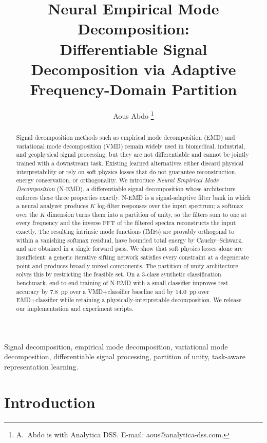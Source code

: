 \documentclass[journal]{IEEEtran}
\title{Neural Empirical Mode Decomposition:\\
Differentiable Signal Decomposition via Adaptive Frequency-Domain Partition}
\author{Aous Abdo%
\thanks{A.~Abdo is with Analytica DSS. E-mail: aous@analytica-dss.com.}%
}
\begin{document}
\maketitle

\begin{abstract}
Signal decomposition methods such as empirical mode decomposition (EMD) and variational mode decomposition (VMD) remain widely used in biomedical, industrial, and geophysical signal processing, but they are not differentiable and cannot be jointly trained with a downstream task. Existing learned alternatives either discard physical interpretability or rely on soft physics losses that do not guarantee reconstruction, energy conservation, or orthogonality. We introduce \emph{Neural Empirical Mode Decomposition} (N-EMD), a differentiable signal decomposition whose architecture enforces these three properties exactly. N-EMD is a signal-adaptive filter bank in which a neural analyzer produces $K$ log-filter responses over the input spectrum; a softmax over the $K$ dimension turns them into a partition of unity, so the filters sum to one at every frequency and the inverse FFT of the filtered spectra reconstructs the input exactly. The resulting intrinsic mode functions (IMFs) are provably orthogonal to within a vanishing softmax residual, have bounded total energy by Cauchy--Schwarz, and are obtained in a single forward pass. We show that soft physics losses alone are insufficient: a generic iterative sifting network satisfies every constraint at a degenerate point and produces broadly mixed components. The partition-of-unity architecture solves this by restricting the feasible set. On a 3-class synthetic classification benchmark, end-to-end training of N-EMD with a small classifier improves test accuracy by $7.8$~pp over a VMD+classifier baseline and by $14.0$~pp over EMD+classifier while retaining a physically-interpretable decomposition. We release our implementation and experiment scripts.
\end{abstract}

\begin{IEEEkeywords}
Signal decomposition, empirical mode decomposition, variational mode decomposition, differentiable signal processing, partition of unity, task-aware representation learning.
\end{IEEEkeywords}

\section{Introduction}
\label{sec:intro}
\end{document}
